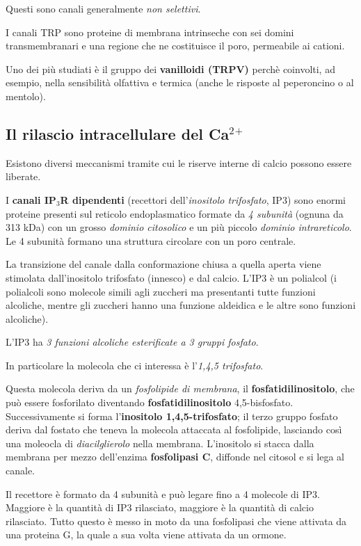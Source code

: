 \documentclass[]{article}
\begin{document}
Questi sono canali generalmente \emph{non selettivi}.

I canali TRP sono proteine di membrana intrinseche con sei domini
transmembranari e una regione che ne costituisce il poro, permeabile ai
cationi.

Uno dei più studiati è il gruppo dei \textbf{vanilloidi (TRPV)} perchè
coinvolti, ad esempio, nella sensibilità olfattiva e termica (anche le
risposte al peperoncino o al mentolo).

\subsection{\texorpdfstring{Il rilascio intracellulare del
Ca\(^2\)\(^+\)}{Il rilascio intracellulare del Ca\^{}2\^{}+}}\label{il-rilascio-intracellulare-del-ca2}

Esistono diversi meccanismi tramite cui le riserve interne di calcio
possono essere liberate.

I \textbf{canali IP\(_3\)R dipendenti} (recettori dell'\emph{inositolo
trifosfato}, IP3) sono enormi proteine presenti sul reticolo
endoplasmatico formate da \emph{4 subunità} (ognuna da 313 kDa) con un
grosso \emph{dominio citosolico} e un più piccolo \emph{dominio
intrareticolo}. Le 4 subunità formano una struttura circolare con un
poro centrale.

La transizione del canale dalla conformazione chiusa a quella aperta
viene stimolata dall'inositolo trifosfato (innesco) e dal calcio. L'IP3
è un polialcol (i polialcoli sono molecole simili agli zuccheri ma
presentanti tutte funzioni alcoliche, mentre gli zuccheri hanno una
funzione aldeidica e le altre sono funzioni alcoliche).

L'IP3 ha \emph{3 funzioni alcoliche esterificate a 3 gruppi fosfato}.

In particolare la molecola che ci interessa è l'\emph{1,4,5 trifosfato}.

Questa molecola deriva da un \emph{fosfolipide di membrana}, il
\textbf{fosfatidilinositolo}, che può essere fosforilato diventando
\textbf{fosfatidilinositolo} 4,5-bisfosfato. Successivamente si forma
l'\textbf{inositolo 1,4,5-trifosfato}; il terzo gruppo fosfato deriva
dal fostato che teneva la molecola attaccata al fosfolipide, lasciando
così una moleocla di \emph{diacilglierolo} nella membrana. L'inositolo
si stacca dalla membrana per mezzo dell'enzima \textbf{fosfolipasi C},
diffonde nel citosol e si lega al canale.

Il recettore è formato da 4 subunità e può legare fino a 4 molecole di
IP3. Maggiore è la quantità di IP3 rilasciato, maggiore è la quantità di
calcio rilasciato. Tutto questo è messo in moto da una fosfolipasi che
viene attivata da una proteina G, la quale a sua volta viene attivata da
un ormone.
\end{document}
